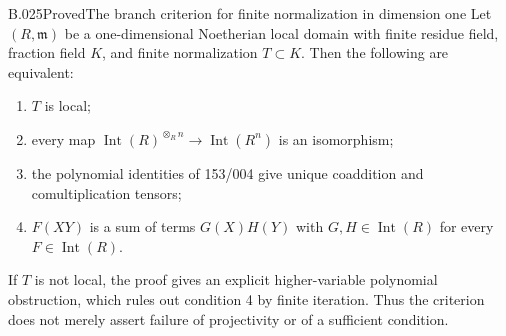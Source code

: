 \begin{saresult}{B.025}{Proved}{The branch criterion for finite normalization in dimension one}
Let $(R,\mathfrak m)$ be a one-dimensional Noetherian local domain
with finite residue field, fraction field $K$, and finite
normalization $T\subset K$. Then the following are equivalent:
\begin{enumerate}
\item $T$ is local;
\item every map $\operatorname{Int}(R)^{\otimes_R n}
\to\operatorname{Int}(R^n)$ is an isomorphism;
\item the polynomial identities of 153/004 give unique coaddition
and comultiplication tensors;
\item $F(XY)$ is a sum of terms $G(X)H(Y)$ with
$G,H\in\operatorname{Int}(R)$ for every $F\in\operatorname{Int}(R)$.
\end{enumerate}
If $T$ is not local, the proof gives an explicit higher-variable
polynomial obstruction, which rules out condition 4 by finite
iteration. Thus the criterion does not merely assert failure of
projectivity or of a sufficient condition.
\end{saresult}

